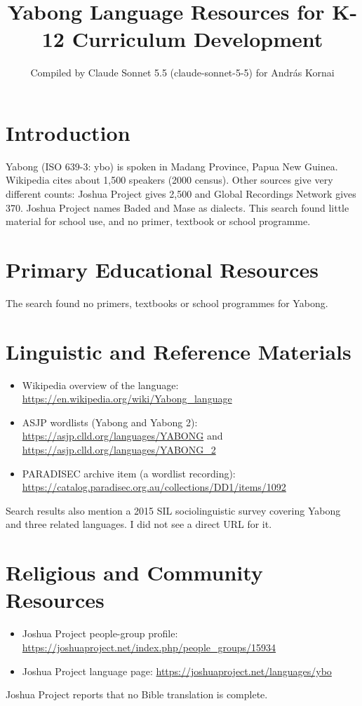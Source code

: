 \documentclass[12pt]{article}
\title{Yabong Language Resources for K-12 Curriculum Development}
\author{Compiled by Claude Sonnet 5.5 (claude-sonnet-5-5) for Andr\'as Kornai}
\date{}
\begin{document}
\maketitle

\section{Introduction}
Yabong (ISO 639-3: ybo) is spoken in Madang Province, Papua New Guinea. Wikipedia cites about 1,500 speakers (2000 census). Other sources give very different counts: Joshua Project gives 2,500 and Global Recordings Network gives 370. Joshua Project names Baded and Mase as dialects. This search found little material for school use, and no primer, textbook or school programme.

\section{Primary Educational Resources}
The search found no primers, textbooks or school programmes for Yabong.

\section{Linguistic and Reference Materials}
\begin{itemize}
\item Wikipedia overview of the language: \url{https://en.wikipedia.org/wiki/Yabong_language}
\item ASJP wordlists (Yabong and Yabong 2): \url{https://asjp.clld.org/languages/YABONG} and \url{https://asjp.clld.org/languages/YABONG_2}
\item PARADISEC archive item (a wordlist recording): \url{https://catalog.paradisec.org.au/collections/DD1/items/1092}
\end{itemize}
Search results also mention a 2015 SIL sociolinguistic survey covering Yabong and three related languages. I did not see a direct URL for it.

\section{Religious and Community Resources}
\begin{itemize}
\item Joshua Project people-group profile: \url{https://joshuaproject.net/index.php/people_groups/15934}
\item Joshua Project language page: \url{https://joshuaproject.net/languages/ybo}
\end{itemize}
Joshua Project reports that no Bible translation is complete.
\end{document}
